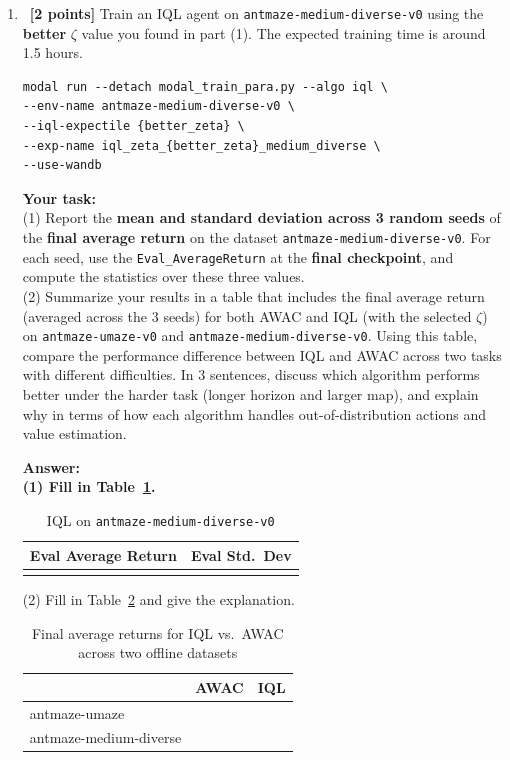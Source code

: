\documentclass[12pt]{article}
\newcommand{\answer}[1]{{\bf \color{red}Answer:\\ #1}}
\begin{document}
\begin{enumerate}
{(2) Explanation:
}

\item~\textbf{[2 points]} Train an IQL agent on \texttt{antmaze-medium-diverse-v0} using the \textbf{better} $\zeta$ value you found in part (1). The expected training time is around 1.5 hours. 

\begin{tcolorbox}[width=\linewidth, sharp corners=all, colback=white!95!black]
\begin{verbatim}
modal run --detach modal_train_para.py --algo iql \
--env-name antmaze-medium-diverse-v0 \
--iql-expectile {better_zeta} \
--exp-name iql_zeta_{better_zeta}_medium_diverse \
--use-wandb
\end{verbatim}
\end{tcolorbox}


\textbf{Your task:}\\
(1) Report the \textbf{mean and standard deviation across 3 random seeds} of the \textbf{final average return} on the dataset \texttt{antmaze-medium-diverse-v0}. For each seed, use the \texttt{Eval\_AverageReturn} at the \textbf{final checkpoint}, and compute the statistics over these three values.\\
(2) Summarize your results in a table that includes the final average return (averaged across the 3 seeds) for both AWAC and IQL (with the selected $\zeta$) on \texttt{antmaze-umaze-v0} and \texttt{antmaze-medium-diverse-v0}. Using this table, compare the performance difference between IQL and AWAC across two tasks with different difficulties. In 3 sentences, discuss which algorithm performs better under the harder task (longer horizon and larger map), and explain why in terms of how each algorithm handles out-of-distribution actions and value estimation.


\answer{
(1) Fill in Table~\ref{table:iql_antmaze_medium_diverse}.
\begin{table}[htbp]
  \centering
  \caption{IQL on \texttt{antmaze-medium-diverse-v0}}
  \vspace{3pt}
  \label{table:iql_antmaze_medium_diverse}
  \begin{tabular}{|c|c|}
    \toprule
    Eval Average Return & Eval Std.\ Dev \\
    \midrule
      &  \\
    \bottomrule
  \end{tabular}
\end{table}
 
(2) Fill in Table~\ref{table:all_comp} and give the explanation.
\begin{table}[H]
  \centering
  \caption{Final average returns for IQL vs.\ AWAC across two offline datasets}
  \label{table:all_comp}
  \begin{tabular}{|l|c|c|}
    \toprule
     & AWAC & IQL \\
    \midrule
     antmaze-umaze & &  \\
     antmaze-medium-diverse &  &  \\
    \bottomrule
  \end{tabular}
\end{table}
 
}
\end{enumerate}
\end{document}
